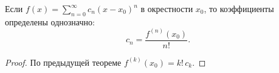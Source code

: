 \begin{theorem}
  Если $f(x) = \sum_{n=0}^\infty c_n(x-x_0)^n$ в окрестности $x_0$, то коэффициенты
  определены однозначно:
  \[
    c_n = \frac{f^{(n)}(x_0)}{n!}.
  \]
  \begin{proof}
    По предыдущей теореме $f^{(k)}(x_0) = k!\, c_k$. \qedhere
  \end{proof}
\end{theorem}
